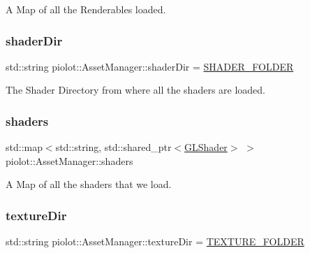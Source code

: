 A Map of all the Renderables loaded. 

\mbox{\label{classpiolot_1_1_asset_manager_a0c7c10a24343176f2de6aeb2ddf1ac0d}} 
\subsubsection{\texorpdfstring{shader\+Dir}{shaderDir}}
{\footnotesize\ttfamily std\+::string piolot\+::\+Asset\+Manager\+::shader\+Dir = \mbox{\hyperlink{_folder_locations_8h_abcb8d25bec836dd9c9bf096e180aa64b}{S\+H\+A\+D\+E\+R\+\_\+\+F\+O\+L\+D\+ER}}}



The Shader Directory from where all the shaders are loaded. 

\mbox{\label{classpiolot_1_1_asset_manager_ae8db7f8aa294e32d270181e4ba87d2ad}} 
\subsubsection{\texorpdfstring{shaders}{shaders}}
{\footnotesize\ttfamily std\+::map$<$std\+::string, std\+::shared\+\_\+ptr$<$\mbox{\hyperlink{classpiolot_1_1_g_l_shader}{G\+L\+Shader}}$>$ $>$ piolot\+::\+Asset\+Manager\+::shaders}



A Map of all the shaders that we load. 

\mbox{\label{classpiolot_1_1_asset_manager_a001707738b5a8e9da3fd5bfd3557392a}} 
\subsubsection{\texorpdfstring{texture\+Dir}{textureDir}}
{\footnotesize\ttfamily std\+::string piolot\+::\+Asset\+Manager\+::texture\+Dir = \mbox{\hyperlink{_folder_locations_8h_a6091860db09533ddbf7ce1b197eaaead}{T\+E\+X\+T\+U\+R\+E\+\_\+\+F\+O\+L\+D\+ER}}}



